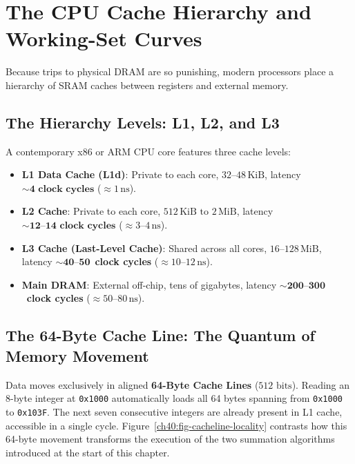 \chapterline

\section{The CPU Cache Hierarchy and Working-Set Curves}

Because trips to physical DRAM are so punishing, modern processors place a hierarchy
of SRAM caches between registers and external memory.

\subsection{The Hierarchy Levels: L1, L2, and L3}

A contemporary x86 or ARM CPU core features three cache levels:
\begin{itemize}[itemsep=0pt]
    \item \textbf{L1 Data Cache (L1d)}: Private to each core, $32\text{--}48\,\text{KiB}$, latency $\sim \mathbf{4\text{ clock cycles}}$ ($\approx 1\,\text{ns}$).
    \item \textbf{L2 Cache}: Private to each core, $512\,\text{KiB}\text{ to }2\,\text{MiB}$, latency $\sim \mathbf{12\text{--}14\text{ clock cycles}}$ ($\approx 3\text{--}4\,\text{ns}$).
    \item \textbf{L3 Cache (Last-Level Cache)}: Shared across all cores, $16\text{--}128\,\text{MiB}$, latency $\sim \mathbf{40\text{--}50}$~\textbf{clock cycles} ($\approx 10\text{--}12\,\text{ns}$).
    \item \textbf{Main DRAM}: External off-chip, tens of gigabytes, latency $\sim \mathbf{200\text{--}300}$~\textbf{clock cycles} ($\approx 50\text{--}80\,\text{ns}$).
\end{itemize}

\subsection{The 64-Byte Cache Line: The Quantum of Memory Movement}

Data moves exclusively in aligned \textbf{64-Byte Cache Lines} ($512\text{ bits}$).
Reading an 8-byte integer at \texttt{0x1000} automatically loads all 64 bytes spanning
from \texttt{0x1000} to \texttt{0x103F}. The next seven consecutive integers are
already present in L1 cache, accessible in a single cycle.
Figure~\ref{ch40:fig-cacheline-locality} contrasts how this 64-byte movement transforms
the execution of the two summation algorithms introduced at the start of this chapter.


